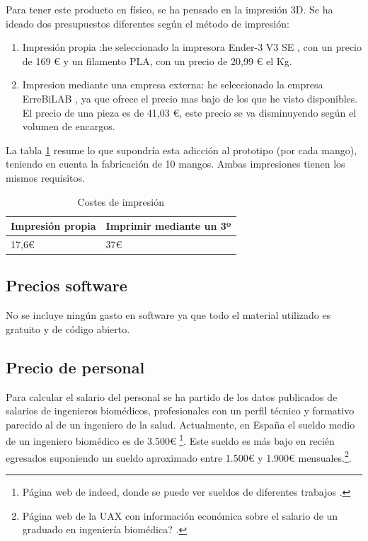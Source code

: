 Para tener este producto en físico, se ha pensado en la impresión 3D. 
Se ha ideado dos presupuestos diferentes según el método de impresión:
\begin{enumerate}
    \item Impresión propia :he seleccionado la impresora Ender-3 V3 SE \cite{Ender-3}, con un precio de 169 € y un filamento PLA\cite{PLA}, con un precio de  20,99 € el Kg. 
    \item Impresion mediante una empresa externa: he seleccionado la empresa ErreBiLAB \cite{ErreBiLAB}, ya que ofrece el precio mas bajo de los que he visto disponibles. El precio de una pieza es de 41,03 €, este precio se va disminuyendo según el volumen de encargos. 
\end{enumerate}

La tabla \ref{tab:Impresión} resume lo que supondría esta adicción al prototipo (por cada mango), teniendo en cuenta la fabricación de 10 mangos. 
Ambas impresiones tienen los mismos requisitos.
\begin{table}[h] 
    \centering
    \begin{tabular}{|l|l|}
    \hline
    \rowcolor[HTML]{BFBFBF} 
    \textbf{Impresión propia} & \textbf{Imprimir mediante un 3º} \\ \hline
     17,6€ & 37€  \\ \hline
    \end{tabular}
    \caption{Costes de impresión}
    \label{tab:Impresión}
\end{table}

\subsection{Precios software}
No se incluye ningún gasto en software ya que todo el material utilizado es gratuito y de código abierto.

\subsection{Precio de personal}
Para calcular el salario del personal se ha partido de los datos publicados de salarios de ingenieros biomédicos, profesionales con un perfil técnico y formativo parecido al de un ingeniero de la salud.
Actualmente, en España el sueldo medio de un ingeniero biomédico es de 3.500€ \cite{SueldoBioing}\footnote{Página web de indeed, donde se puede ver sueldos de diferentes trabajos  \cite{SueldoBioing}.}\cite{SUELDO}. Este sueldo es más bajo en recién egresados suponiendo un sueldo aproximado entre 1.500€ y 1.900€ mensuales.\cite{Sueldo_egresado}\footnote{Página web de la UAX con información económica sobre el salario de un graduado en ingeniería biomédica? \cite{Sueldo_egresado}.}.


